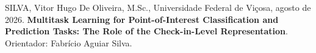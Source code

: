     \begin{resumo}[Resumo]
        \singlespacing
        SILVA, Vitor Hugo De Oliveira, M.Sc., Universidade Federal de Viçosa, agosto de 2026.
        \textbf{Multitask Learning for Point-of-Interest Classification and Prediction Tasks: The Role of the Check-in-Level Representation}. Orientador: Fabrício Aguiar Silva.
        \vspace{\onelineskip}

\end{resumo}
